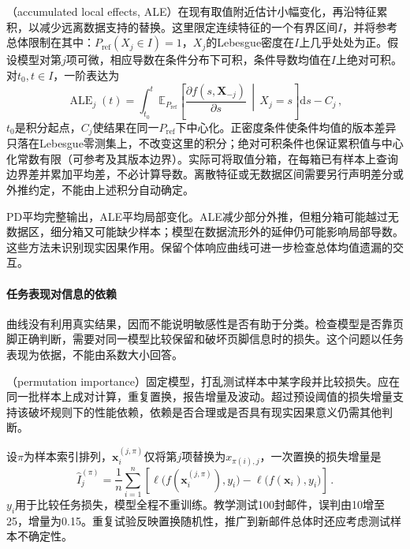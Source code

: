 （accumulated local effects, ALE）在现有取值附近估计小幅变化，再沿特征累积，以减少远离数据支持的替换。这里限定连续特征的一个有界区间$I$，并将参考总体限制在其中：$P_{\mathrm{ref}}(X_j\in I)=1$，$X_j$的Lebesgue密度在$I$上几乎处处为正。假设模型对第$j$项可微，相应导数在条件分布下可积，条件导数均值在$I$上绝对可积。对$t_0,t\in I$，一阶表达为
\begin{equation}
 \operatorname{ALE}_j(t)
 =\int_{t_0}^{t}
 \mathbb E_{P_{\mathrm{ref}}}\!\left[
 \frac{\partial f(s,\bm X_{-j})}{\partial s}
 \,\middle|\,X_j=s\right]\mathrm ds-C_j\, ,
 \label{eq:interpretability-ale}
\end{equation}
$t_0$是积分起点，$C_j$使结果在同一$P_{\mathrm{ref}}$下中心化。正密度条件使条件均值的版本差异只落在Lebesgue零测集上，不改变这里的积分；绝对可积条件也保证累积值与中心化常数有限（可参考及其版本边界）。实际可将取值分箱，在每箱已有样本上查询边界差并累加平均差，不必计算导数。离散特征或无数据区间需要另行声明差分或外推约定，不能由上述积分自动确定。

PD平均完整输出，ALE平均局部变化。ALE减少部分外推，但粗分箱可能越过无数据区，细分箱又可能缺少样本；模型在数据流形外的延伸仍可能影响局部导数。这些方法未识别现实因果作用。保留个体响应曲线可进一步检查总体均值遗漏的交互。

\paragraph{任务表现对信息的依赖}

曲线没有利用真实结果，因而不能说明敏感性是否有助于分类。检查模型是否靠页脚正确判断，需要对同一模型比较保留和破坏页脚信息时的损失。这个问题以任务表现为依据，不能由系数大小回答。

（permutation importance）固定模型，打乱测试样本中某字段并比较损失。应在同一批样本上成对计算，重复置换，报告增量及波动。超过预设阈值的损失增量支持该破坏规则下的性能依赖，依赖是否合理或是否具有现实因果意义仍需其他判断。

设$\pi$为样本索引排列，$\bm x_i^{(j,\pi)}$仅将第$j$项替换为$x_{\pi(i),j}$，一次置换的损失增量是
\begin{equation}
 \widehat I_j^{(\pi)}
 =\frac1n\sum_{i=1}^n\left[
 \ell\bigl(f(\bm{x}_i^{(j,\pi)}),y_i\bigr)
 -\ell\bigl(f(\bm{x}_i),y_i\bigr)\right]\, .
 \label{eq:interpretability-permutation}
\end{equation}
$y_i$用于比较任务损失，模型全程不重训练。教学测试100封邮件，误判由10增至25，增量为0.15。重复试验反映置换随机性，推广到新邮件总体时还应考虑测试样本不确定性。

